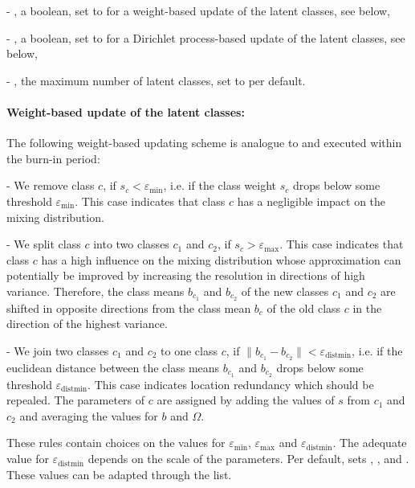 \documentclass[article]{jss}
\begin{document}
- , a boolean, set to  for a weight-based update of the latent classes, see below,

- , a boolean, set to  for a Dirichlet process-based update of the latent classes, see below,

- , the maximum number of latent classes, set to  per default.

\paragraph{Weight-based update of the latent classes:}

The following weight-based updating scheme is analogue to \cite{Bauer:2019} and executed within the burn-in period:

- We remove class $c$, if $s_c<\varepsilon_{\text{min}}$, i.e. if the class weight $s_c$ drops below some threshold $\varepsilon_{\text{min}}$. This case indicates that class $c$ has a negligible impact on the mixing distribution.

- We split class $c$ into two classes $c_1$ and $c_2$, if $s_c>\varepsilon_\text{max}$. This case indicates that class $c$ has a high influence on the mixing distribution whose approximation can potentially be improved by increasing the resolution in directions of high variance. Therefore, the class means $b_{c_1}$ and $b_{c_2}$ of the new classes $c_1$ and $c_2$ are shifted in opposite directions from the class mean $b_c$ of the old class $c$ in the direction of the highest variance.

- We join two classes $c_1$ and $c_2$ to one class $c$, if $\lVert b_{c_1} - b_{c_2} \rVert<\varepsilon_{\text{distmin}}$, i.e. if the euclidean distance between the class means $b_{c_1}$ and $b_{c_2}$  drops below some threshold $\varepsilon_{\text{distmin}}$. This case indicates location redundancy which should be repealed. The parameters of $c$ are assigned by adding the values of $s$ from $c_1$ and $c_2$ and averaging the values for $b$ and $\Omega$.

These rules contain choices on the values for $\varepsilon_{\text{min}}$, $\varepsilon_{\text{max}}$ and $\varepsilon_{\text{distmin}}$. The adequate value for $\varepsilon_{\text{distmin}}$ depends on the scale of the parameters. Per default,  sets  , , and . These values can be adapted through the  list.
\end{document}
